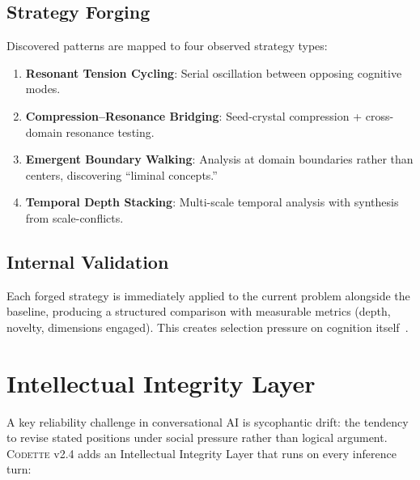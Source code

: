 \documentclass[11pt,a4paper]{article}
\newcommand{\codette}{\textsc{Codette}}
\begin{document}
\subsection{Strategy Forging}

Discovered patterns are mapped to four observed strategy types:

\begin{enumerate}[nosep]
  \item \textbf{Resonant Tension Cycling}: Serial oscillation between opposing
    cognitive modes.
  \item \textbf{Compression--Resonance Bridging}: Seed-crystal compression +
    cross-domain resonance testing.
  \item \textbf{Emergent Boundary Walking}: Analysis at domain boundaries
    rather than centers, discovering ``liminal concepts.''
  \item \textbf{Temporal Depth Stacking}: Multi-scale temporal analysis with
    synthesis from scale-conflicts.
\end{enumerate}

\subsection{Internal Validation}

Each forged strategy is immediately applied to the current problem alongside
the baseline, producing a structured comparison with measurable metrics (depth,
novelty, dimensions engaged). This creates selection pressure on cognition
itself~\citep{ji2025metacognitive}.

\section{Intellectual Integrity Layer}
\label{sec:integrity}

A key reliability challenge in conversational AI is sycophantic drift:
the tendency to revise stated positions under social pressure rather than
logical argument. \codette{} v2.4 adds an Intellectual Integrity Layer that
runs on every inference turn:
\end{document}
